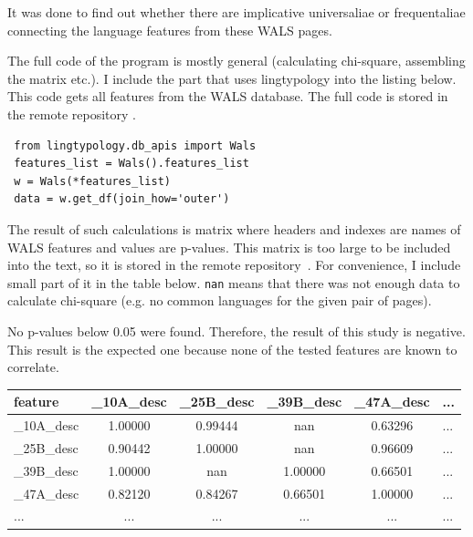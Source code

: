 \documentclass[a4paper,12pt]{article}
\begin{document}
It was done to find out whether there are implicative universaliae or frequentaliae connecting the language features from these WALS pages.

The full code of the program is mostly general (calculating chi-square, assembling the matrix etc.). I include the part that uses lingtypology into the listing below. This code gets all features from the WALS database. The full code is stored in the remote repository \parencite[WALS: Quantitative Research.ipynb]{lingtypologyResearch}.
\bigskip

\noindent
\begin{minipage}{\textwidth}
\begin{lstlisting}
 from lingtypology.db_apis import Wals
 features_list = Wals().features_list
 w = Wals(*features_list)
 data = w.get_df(join_how='outer')
\end{lstlisting}
\end{minipage}
\bigskip

The result of such calculations is matrix where headers and indexes are names of WALS features and values are p-values. This matrix is too large to be included into the text, so it is stored in the remote repository~\parencite[WALS: Quantitative Research.ipynb]{lingtypologyResearch}. For convenience, I include small part of it in the table below. \texttt{nan} means that there was not enough data to calculate chi-square (e.g. no common languages for the given pair of pages).

No p-values below 0.05 were found. Therefore, the result of this study is negative. This result is the expected one because none of the tested features are known to correlate.

\noindent
\begin{minipage}{\textwidth}
\begin{tabular}{|l|cccc|l|}
\hline
feature & \_10A\_desc & \_25B\_desc & \_39B\_desc & \_47A\_desc & ... \\
\hline
\_10A\_desc &   1.00000 &   0.99444 &       nan &   0.63296 &   ... \\
\_25B\_desc &   0.90442 &   1.00000 &       nan &   0.96609 &   ... \\
\_39B\_desc &   1.00000 &       nan &   1.00000 &   0.66501 &   ... \\
\_47A\_desc &   0.82120 &   0.84267 &   0.66501 &   1.00000 &   ... \\
\hline
... &   ... &   ... &       ... &   ... &   ... \\
\hline
\end{tabular}
\end{minipage}
\end{document}
